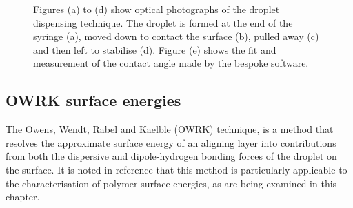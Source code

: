 \begin{figure}
\begin{center}
\end{center}
\caption[Droplet dispensing for contact angle measurement]{\label{fig:contact_angles}Figures (a) to (d) show optical photographs of the droplet dispensing technique. The droplet is formed at the end of the syringe (a), moved down to contact the surface (b), pulled away (c) and then left to stabilise (d). Figure (e) shows the fit and measurement of the contact angle made by the bespoke software.}
\end{figure}

\subsection{OWRK surface energies}
\label{sec:owrk}
The Owens, Wendt, Rabel and Kaelble (OWRK) technique, is a method that resolves the approximate surface energy of an aligning layer into contributions from both the dispersive and dipole-hydrogen bonding forces of the droplet on the surface. It is noted in reference \cite{Owens1969} that this method is particularly applicable to the characterisation of polymer surface energies, as are being examined in this chapter. 


